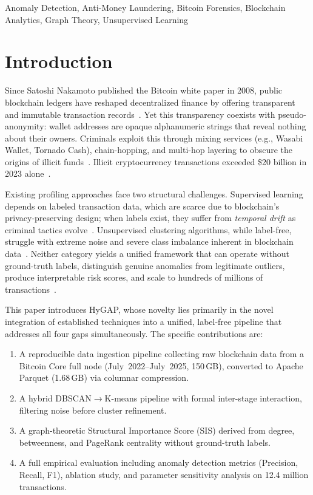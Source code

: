 \documentclass[conference]{IEEEtran}
\begin{document}
\begin{IEEEkeywords}
Anomaly Detection, Anti-Money Laundering, Bitcoin Forensics,
Blockchain Analytics, Graph Theory, Unsupervised Learning
\end{IEEEkeywords}

\section{Introduction}

Since Satoshi Nakamoto published the Bitcoin white paper in 2008,
public blockchain ledgers have reshaped decentralized finance by
offering transparent and immutable transaction records~\cite{b1}.
Yet this transparency coexists with pseudo-anonymity: wallet addresses
are opaque alphanumeric strings that reveal nothing about their owners.
Criminals exploit this through mixing services (e.g., Wasabi Wallet,
Tornado Cash), chain-hopping, and multi-hop layering to obscure the
origins of illicit funds~\cite{b2}. Illicit cryptocurrency
transactions exceeded \$20 billion in 2023 alone~\cite{b3}.

Existing profiling approaches face two structural challenges.
Supervised learning depends on labeled transaction data, which are
scarce due to blockchain's privacy-preserving design; when labels
exist, they suffer from \emph{temporal drift} as criminal tactics
evolve~\cite{b4}. Unsupervised clustering algorithms, while
label-free, struggle with extreme noise and severe class imbalance
inherent in blockchain data~\cite{b5}. Neither category yields a
unified framework that can operate without ground-truth labels,
distinguish genuine anomalies from legitimate outliers, produce
interpretable risk scores, and scale to hundreds of millions of
transactions~\cite{b6}.

This paper introduces HyGAP, whose novelty lies primarily in the
novel integration of established techniques into a unified,
label-free pipeline that addresses all four gaps simultaneously.
The specific contributions are:
\begin{enumerate}
  \item A reproducible data ingestion pipeline collecting raw
        blockchain data from a Bitcoin Core full node
        (July~2022--July~2025, 150\,GB), converted to Apache
        Parquet (1.68\,GB) via columnar compression.
  \item A hybrid DBSCAN$\rightarrow$K-means pipeline with formal
        inter-stage interaction, filtering noise before cluster
        refinement.
  \item A graph-theoretic Structural Importance Score (SIS) derived
        from degree, betweenness, and PageRank centrality without
        ground-truth labels.
  \item A full empirical evaluation including anomaly detection
        metrics (Precision, Recall, F1), ablation study, and
        parameter sensitivity analysis on 12.4 million transactions.
\end{enumerate}
\end{document}
